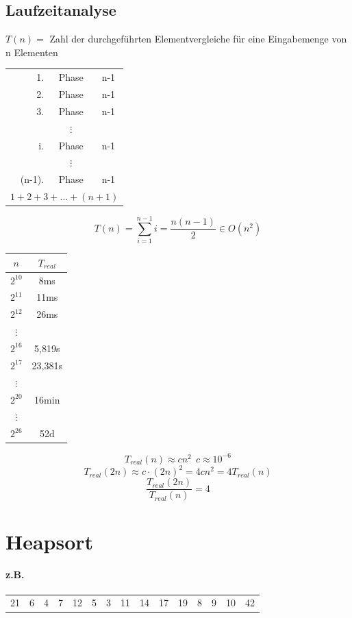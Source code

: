 \pagebreak

\subsection{Laufzeitanalyse}

$T(n) =$ Zahl der durchgeführten Elementvergleiche für eine Eingabemenge von n Elementen\\

\begin{tabular}{rcc}
	1.&Phase & n-1 \\
	2.&Phase & n-1 \\
	3.&Phase & n-1 \\
	 & $\vdots$ &  \\
	i.& Phase & n-1 \\
	 & $\vdots$ &  \\
	(n-1).&Phase & n-1 \\ \hline
	\multicolumn{3}{c}{$1+2+3+\ldots+(n+1)$}
\end{tabular}
\[ T(n)=\sum_{i=1}^{n-1} i = \frac{n(n-1)}{2}\in O(n^2) \]
\begin{tabular}{c|c}
	$n$ & $T_{real}$ \\ \hline
	$2^{10}$ & 8ms \\
	$2^{11}$ & 11ms \\
	$2^{12}$ & 26ms \\
	$\vdots$ &  \\
	$2^{16}$ & 5,819s \\
	$2^{17}$ & 23,381s \\
	$\vdots$ &  \\
	$2^{20}$ & 16min \\
	$\vdots$ &  \\
	$2^{26}$ & 52d 
\end{tabular}
\[ T_{real}(n)\approx cn^2~~ c\approx10^{-6}\]
\[T_{real} (2n) \approx c \cdot (2n)^2 = 4 cn^2 = 4T_{real}(n) \]
\[\frac{T_{real}(2n)}{T_{real}(n)} = 4 \]

\newpage

\section{Heapsort}
\paragraph{z.B.} \begin{tabular}{ccccccccccccccc}
	21&6&4&7&12&5&3&11&14&17&19&8&9&10&42
\end{tabular}

